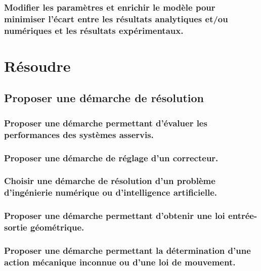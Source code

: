 \documentclass[10pt,fleqn]{book}
\newcommand{\repRel}{../..}
\newcommand{\repStyle}{\repRel/Style}
\newcommand{\td}{fichier_td}
\newcommand{\repExos}{\repRel/ExercicesCompetences}
\newcommand{\repExo}{dossier}
\begin{document}
\subsection{Modifier les paramètres et enrichir le modèle pour minimiser l’écart entre les résultats analytiques et/ou numériques et les résultats expérimentaux.} 

\chapter{Résoudre} 

\section{Proposer une démarche de résolution} 

\subsection{Proposer une démarche permettant d'évaluer les performances des systèmes asservis.} 

\subsection{Proposer une démarche de réglage d'un correcteur.} 

\renewcommand{\repExo}{\repExos/C1_ProposerDemarche/C1_02_ProposerDemarcheReglageCorrecteur/50_BancBalafre}
\renewcommand{\td}{50_BancBalafre}
\graphicspath{{\repStyle/png/}{\repExo/images/}}


\subsection{Choisir une démarche de résolution d’un problème d'ingénierie numérique ou d'intelligence artificielle. } 

\subsection{Proposer une démarche permettant d'obtenir une loi entrée-sortie géométrique. } 

\subsection{Proposer une démarche permettant la détermination d’une action mécanique inconnue ou d'une loi de mouvement.} 

\renewcommand{\repExo}{\repExos/C1_ProposerDemarche/C1_05_ProposerDemarcheActionMecaLoiMvt_PFD/01_T}
\renewcommand{\td}{01_T}
\graphicspath{{\repStyle/png/}{\repExo/images/}}

\end{document}
